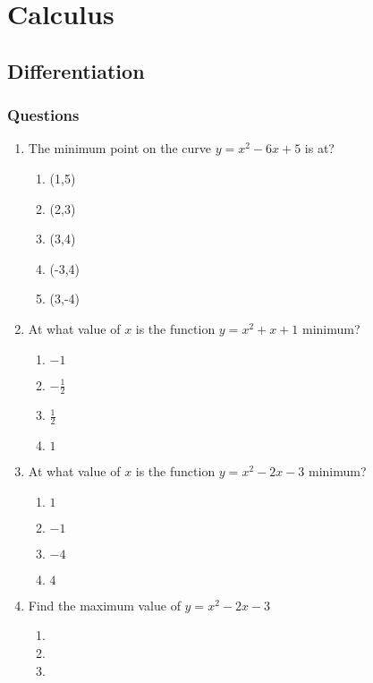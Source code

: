 \chapter{Calculus}
\section{Differentiation}
\subsection*{Questions}
\begin{enumerate}[label={\arabic*.}]
  \item The minimum point on the curve \(y = x^2 - 6x + 5\) is at?
        \begin{enumerate}[label={\Alph*.}]
            \item (1,5)
            \item (2,3)
            \item (3,4)
            \item (-3,4)
            \item (3,-4)
        \end{enumerate}
  \item At what value of \(x\) is the function \(y = x^2 + x + 1\) minimum? 
        \begin{enumerate}[label={\Alph*.}]
            \item \(-1\)
            \item \(-\frac{1}{2}\)
            \item \(\frac{1}{2}\)
            \item \(1\)
        \end{enumerate}
  \item At what value of \(x\) is the function \(y = x^2 - 2x - 3\) minimum?
    \begin{enumerate}[label={\Alph*.}]
            \item \(1\) 
            \item  \(-1\) 
            \item \(-4\)
            \item \(4\)
        \end{enumerate}
  \item Find the maximum value of \(y = x^2 - 2x - 3\)
        \begin{enumerate}[label={\Alph*.}]
            \item 
            \item 
            \item 

\end{enumerate}
\end{enumerate}
